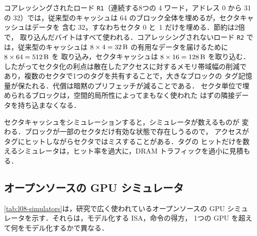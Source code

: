 \documentclass[../main.tex]{subfiles}
\begin{document}
コアレッシングされたロード \texttt{R1}（連続する8つの \SI{4}{\byte}
ワード，アドレス 0 から 31 の \SI{32}{\byte}）では，従来型のキャッシュは
\SI{64}{\byte} のブロック全体を埋めるが，セクタキャッシュはデータを
含む \SI{32}{\byte}，すなわちセクタ 0 と~1 だけを埋める．節約は2倍で，
取り込んだバイトはすべて使われる．コアレッシングされないロード
\texttt{R2} では，従来型のキャッシュは $8 \times 4 = \SI{32}{\byte}$
の有用なデータを届けるために $8 \times 64 = \SI{512}{\byte}$ を
取り込み，セクタキャッシュは $8 \times 16 = \SI{128}{\byte}$ を取り込む．
したがってセクタ化の利点は散在したアクセスに対するメモリ帯域幅の削減で
あり，複数のセクタで1つのタグを共有することで，大きなブロックの
タグ記憶量が保たれる．代償は暗黙のプリフェッチが減ることである．
セクタ単位で埋められるブロックは，空間的局所性によってまもなく使われた
はずの隣接データを持ち込まなくなる．

\begin{note}
  セクタキャッシュをシミュレーションすると，シミュレータが数えるものが
  変わる．ブロックが一部のセクタだけ有効な状態で存在しうるので，
  アクセスがタグにヒットしながらセクタではミスすることがある．タグの
  ヒットだけを数えるシミュレータは，ヒット率を過大に，DRAM
  トラフィックを過小に見積もる．
\end{note}

\subsection{オープンソースの GPU シミュレータ}

\cref{tab:l08-simulators}は，研究で広く使われているオープンソースの
GPU シミュレータを示す．それらは，モデル化する ISA，命令の得方，
1つの GPU を超えて何をモデル化するかで異なる．
\end{document}
